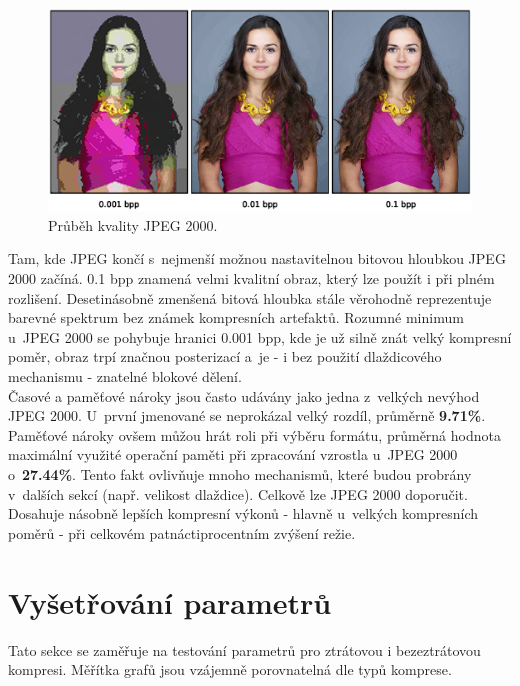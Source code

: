 \clearpage
\begin{figure}[hbt!]
  \centering
  \hspace*{-0.75cm}
  \includegraphics[width=16cm]{obrazky-figures/odhad/fotky_kvalita_odhad.eps}
  \caption{Průběh kvality JPEG 2000.}
\end{figure}

\noindent Tam, kde JPEG končí s~nejmenší možnou nastavitelnou bitovou hloubkou JPEG 2000 začíná. 0.1 bpp znamená velmi kvalitní obraz, který lze použít i při plném rozlišení. Desetinásobně zmenšená bitová hloubka stále věrohodně reprezentuje barevné spektrum bez známek kompresních artefaktů. Rozumné minimum u~JPEG 2000 se pohybuje hranici 0.001 bpp, kde je už silně znát velký kompresní poměr, obraz trpí značnou posterizací a~je - i bez použití dlaždicového mechanismu - znatelné blokové dělení.\\
Časové a paměťové nároky jsou často udávány jako jedna z~velkých nevýhod JPEG 2000. U~první jmenované se neprokázal velký rozdíl, průměrně \textbf{9.71\%}. Paměťové nároky ovšem můžou hrát roli při výběru formátu, průměrná hodnota maximální využité operační paměti při zpracování vzrostla u~JPEG 2000 o~\textbf{27.44\%}. Tento fakt ovlivňuje mnoho mechanismů, které budou probrány v~dalších sekcí (např. velikost dlaždice). Celkově lze JPEG 2000 doporučit. Dosahuje násobně lepších kompresní výkonů - hlavně u~velkých kompresních poměrů - při celkovém patnáctiprocentním zvýšení režie. 

\clearpage
\newpage
\section{Vyšetřování parametrů}
Tato sekce se zaměřuje na testování parametrů pro ztrátovou i bezeztrátovou kompresi. Měřítka grafů jsou vzájemně porovnatelná dle typů komprese.
%
%

